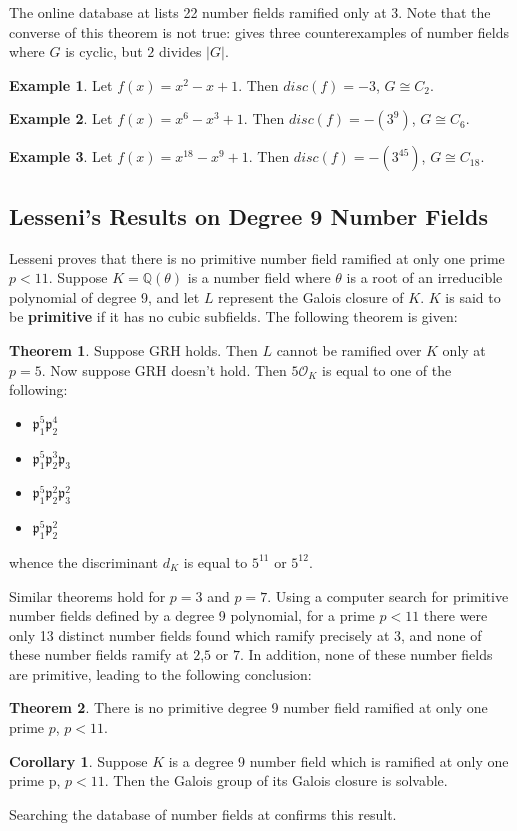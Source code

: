 \documentclass[12pt]{extarticle}
\newcommand{\Q}{\mathbb{Q}}
\newcommand{\<}{\langle}
\renewcommand{\>}{\rangle}
\theoremstyle{definition}
\newtheorem{theorem}{Theorem}
\newtheorem{corollary}{Corollary}
\newtheorem{example}{Example}
\begin{document}
The online database at \cite{JONE2} lists 22 number fields ramified only at 3. Note that the converse of this theorem is not true: \cite{JONE2} gives three counterexamples of number fields where $G$ is cyclic, but $2$ divides $|G|$. 
\begin{example}
Let $f(x) = x^2-x+1$. Then $disc(f) = -3$, $G \cong C_2$.
\end{example}
\begin{example}
Let $f(x) = x^6-x^3+1$. Then $disc(f) = -(3^9)$, $G \cong C_6$.
\end{example}
\begin{example}
Let $f(x) = x^{18}-x^9+1$. Then $disc(f) = -(3^{45})$, $G \cong C_{18}$.
\end{example}

\subsection{Lesseni's Results on Degree 9 Number Fields}
Lesseni \cite{LESSENI} proves that there is no primitive number field ramified at only one prime $p<11$. 
Suppose $K=\Q(\theta)$ is a number field where $\theta$ is a root of an irreducible polynomial of degree 9, and let $L$ represent the Galois closure of $K$. $K$ is said to be \textbf{primitive} if it has no cubic subfields. The following theorem is given:
 \begin{theorem}
    Suppose GRH holds. Then $L$ cannot be ramified over $K$ only at $p=5$. Now suppose GRH doesn't hold. Then $5\mathcal{O}_K$ is equal to one of the following: \begin{itemize}
        \item $\mathfrak{p}_1^5\mathfrak{p}_2^4$
        \item $\mathfrak{p}_1^5\mathfrak{p}_2^3\mathfrak{p}_3$
        \item $\mathfrak{p}_1^5\mathfrak{p}_2^2\mathfrak{p}_3^2$
        \item  $\mathfrak{p}_1^5\mathfrak{p}_2^2$
    \end{itemize}
    whence the discriminant $d_K$ is equal to $5^{11}$ or $5^{12}$. 
\end{theorem}
Similar theorems hold for $p=3$ and $p=7$. Using a computer search for primitive number fields defined by a degree 9 polynomial, for a prime $p<11$ there were only 13 distinct number fields found which ramify precisely at $3$, and none of these number fields ramify at $2$,$5$ or $7$. In addition, none of these number fields are primitive, leading to the following conclusion:
\begin{theorem}
    There is no primitive degree 9 number field ramified at only one prime $p$, $p<11$.
\end{theorem}
\begin{corollary}
 Suppose $K$ is a degree 9 number field which is ramified at only one prime p, $p<11$. Then the Galois group of its Galois closure is solvable. 
\end{corollary}
Searching the database of number fields at \cite{JONE2} confirms this result. 
\end{document}
